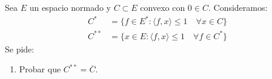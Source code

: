 



\begin{ejercicio}
    Sea $E$ un espacio normado y $C\subset E$ convexo con $0\in C$. Consideramos:
    \begin{align*}
        C^\ast &= \{f\in E^\ast : \langle f,x \rangle \leq 1 \quad \forall x\in C \} \\
        C^{\ast\ast} &= \{x\in E : \langle f,x \rangle \leq 1  \quad \forall f\in C^\ast \}
    \end{align*}
    Se pide:
    \begin{enumerate}
        \item Probar que $C^{\ast\ast} = \overline{C}$.
            

\end{enumerate}
\end{ejercicio}
